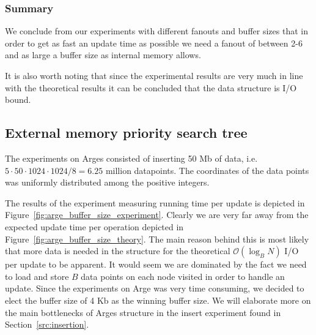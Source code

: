\documentclass[twoside,11pt,openright]{report}
\begin{document}
\clearpage

\subsubsection*{Summary}

We conclude from our experiments with different fanouts and buffer sizes that in order to get as fast an update time as possible we need a fanout of between 2-6 and as large a buffer size as internal memory allows.

It is also worth noting that since the experimental results are very much in line with the theoretical results it can be concluded that the data structure is I/O bound.

\subsection{External memory priority search tree}
\label{subsec:tuning_arge}

The experiments on Arges consisted of inserting 50 Mb of data, i.e. $5 \cdot 50 \cdot 1024 \cdot 1024 / 8 = 6.25$ million datapoints. The coordinates of the data points was uniformly distributed among the positive integers. 

The results of the experiment measuring running time per update is depicted in Figure~\ref{fig:arge_buffer_size_experiment}. Clearly we are very far away from the expected update time per operation depicted in Figure~\ref{fig:arge_buffer_size_theory}. The main reason behind this is most likely that more data is needed in the structure for the theoretical $\mathcal{O}(\log_B N)$ I/O per update to be apparent. It would seem we are dominated by the fact we need to load and store $B$ data points on each node visited in order to handle an update. Since the experiments on Arge was very time consuming, we decided to elect the buffer size of 4 Kb as the winning buffer size. We will elaborate more on the main bottlenecks of Arges structure in the insert experiment found in Section~\ref{src:insertion}.
\end{document}
